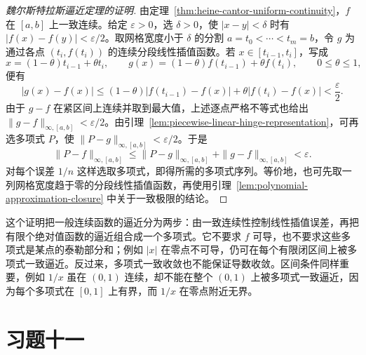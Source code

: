 \begin{proof}[魏尔斯特拉斯逼近定理的证明]
由定理~\ref{thm:heine-cantor-uniform-continuity}，$f$ 在 $[a,b]$ 上一致连续。给定 $\varepsilon>0$，选 $\delta>0$，使 $|x-y|<\delta$ 时有 $|f(x)-f(y)|<\varepsilon/2$。取网格宽度小于 $\delta$ 的分割 $a=t_0<\cdots<t_m=b$，令 $g$ 为通过各点 $(t_i,f(t_i))$ 的连续分段线性插值函数。若 $x\in[t_{i-1},t_i]$，写成
\[
    x=(1-\theta)t_{i-1}+\theta t_i,\qquad
    g(x)=(1-\theta)f(t_{i-1})+\theta f(t_i),
    \qquad 0\leq\theta\leq1,
\]
便有
\[
    |g(x)-f(x)|
       \leq(1-\theta)|f(t_{i-1})-f(x)|
          +\theta|f(t_i)-f(x)|<\frac\varepsilon2.
\]
由于 $g-f$ 在紧区间上连续并取到最大值，上述逐点严格不等式也给出 $\|g-f\|_{\infty,[a,b]}<\varepsilon/2$。由引理~\ref{lem:piecewise-linear-hinge-representation}，可再选多项式 $P$，使 $\|P-g\|_{\infty,[a,b]}<\varepsilon/2$。于是
\[
    \|P-f\|_{\infty,[a,b]}
       \leq\|P-g\|_{\infty,[a,b]}+\|g-f\|_{\infty,[a,b]}
       <\varepsilon.
\]
对每个误差 $1/n$ 这样选取多项式，即得所需的多项式序列。等价地，也可先取一列网格宽度趋于零的分段线性插值函数，再使用引理~\ref{lem:polynomial-approximation-closure} 中关于一致极限的结论。
\end{proof}

这个证明把一般连续函数的逼近分为两步：由一致连续性控制线性插值误差，再把有限个绝对值函数的逼近组合成一个多项式。它不要求 $f$ 可导，也不要求这些多项式是某点的泰勒部分和；例如 $|x|$ 在零点不可导，仍可在每个有限闭区间上被多项式一致逼近。反过来，多项式一致收敛也不能保证导数收敛。区间条件同样重要，例如 $1/x$ 虽在 $(0,1)$ 连续，却不能在整个 $(0,1)$ 上被多项式一致逼近，因为每个多项式在 $[0,1]$ 上有界，而 $1/x$ 在零点附近无界。

\section*{习题十一}

